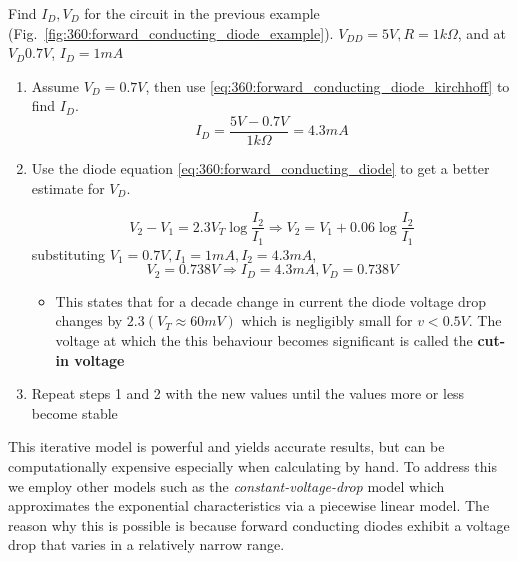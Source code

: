 \documentclass[../notes.tex]{subfiles}
\begin{document}
\begin{example}

	Find $ I_D, V_D $ for the circuit in the previous example (Fig.~\ref{fig:360:forward_conducting_diode_example}). $ V_{DD} = 5V, R = 1k\Omega $, and at $ V_{D} 0.7V$,  $I_D = 1mA $ 


\begin{enumerate}
	\item Assume $ V_D = 0.7V$, then use \eqref{eq:360:forward_conducting_diode_kirchhoff} to find $ I_D $.
		\begin{equation}
			I_D = \frac{5V - 0.7V}{1k\Omega} = 4.3mA
		\end{equation}
		
	\item Use the diode equation \eqref{eq:360:forward_conducting_diode} to get a better estimate for $ V_D $.

		\begin{equation}
			V_2 - V_1 = 2.3 V_T \log \frac{I_2}{I_1} \Rightarrow V_2 = V_1 + 0.06 \log \frac{I_2}{I_1}
		\end{equation}
	substituting $ V_1 = 0.7V, I_1 = 1mA, I_2 = 4.3mA $,
	\begin{equation}
		V_2 = 0.738V \Rightarrow I_D = 4.3mA, V_D = 0.738V
	\end{equation}
	\begin{itemize}
		\item This states that for a decade change in current the diode voltage drop changes by $ 2.3(V_T \approx 60mV) $ which is negligibly small for $ v < 0.5V $. 
		The voltage at which the this behaviour becomes significant is called the \textbf{cut-in voltage} 
	\end{itemize}

\item Repeat steps 1 and 2 with the new values until the values more or less become stable
\end{enumerate}
\end{example}

This iterative model is powerful and yields accurate results, but can be computationally expensive especially when calculating by hand.
To address this we employ other models such as the \textit{constant-voltage-drop} model which approximates the exponential characteristics via a piecewise linear model.
The reason why this is possible is because forward conducting diodes exhibit a voltage drop that varies in a relatively narrow range.
\end{document}
